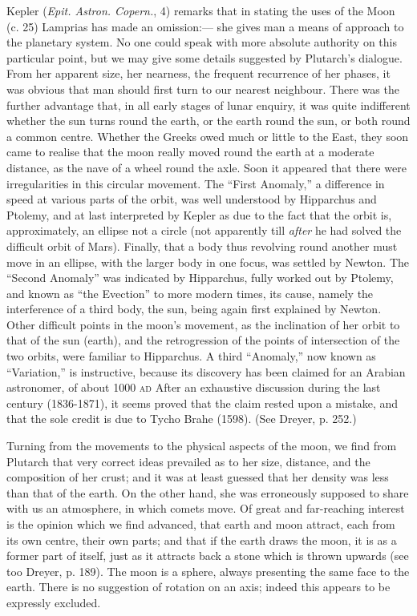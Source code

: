 \documentclass[a4paper, 11pt, oneside, polutonikogreek, english]{article}
\begin{document}
Kepler (\emph{Epit. Astron. Copern.}, 4) remarks that in stating the uses of the Moon (c. 25) Lamprias has made an omission:--- she gives man a means of approach to the planetary system. No one could speak with more absolute authority on this particular point, but we may give some details suggested by Plutarch's dialogue. From her apparent size, her nearness, the frequent recurrence of her phases, it was obvious that man should first turn to our nearest neighbour. There was the further advantage that, in all early stages of lunar enquiry, it was quite indifferent whether the sun turns round the earth, or the earth round the sun, or both round a common centre. Whether the Greeks owed much or little to the East, they soon came to realise that the moon really moved round the earth at a moderate distance, as the nave of a wheel round the axle. Soon it appeared that there were irregularities in this circular movement. The ``First Anomaly,'' a difference in speed at various parts of the orbit, was well understood by Hipparchus and Ptolemy, and at last interpreted by Kepler as due to the fact that the orbit is, approximately, an ellipse not a circle (not apparently till \emph{after} he had solved the difficult orbit of Mars). Finally, that a body thus revolving round another must move in an ellipse, with the larger body in one focus, was settled by Newton. The ``Second Anomaly'' was indicated by Hipparchus, fully worked out by Ptolemy, and known as ``the Evection'' to more modern times, its cause, namely the interference of a third body, the sun, being again first explained by Newton. Other difficult points in the moon's movement, as the inclination of her orbit to that of the sun (earth), and the retrogression of the points of intersection of the two orbits, were familiar to Hipparchus. A third ``Anomaly,'' now known as ``Variation,'' is instructive, because its discovery has been claimed for an Arabian astronomer, of about 1000 \textsc{ad} After an exhaustive discussion during the last century (1836-1871), it seems proved that the claim rested upon a mistake, and that the sole credit is due to Tycho Brahe (1598). (See Dreyer, p. 252.)

Turning from the movements to the physical aspects of the moon, we find from Plutarch that very correct ideas prevailed as to her size, distance, and the composition of her crust; and it was at least guessed that her density was less than that of the earth. On the other hand, she was erroneously supposed to share with us an atmosphere, in which comets move. Of great and far-reaching interest is the opinion which we find advanced, that earth and moon attract, each from its own centre, their own parts; and that if the earth draws the moon, it is as a former part of itself, just as it attracts back a stone which is thrown upwards (see too Dreyer, p. 189). The moon is a sphere, always presenting the same face to the earth. There is no suggestion of rotation on an axis; indeed this appears to be expressly excluded.
\end{document}
